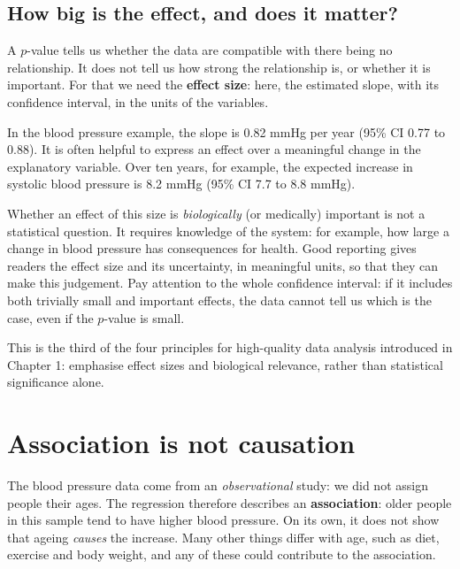 \documentclass[
  letterpaper,
  8pt,
  a4paper]{book}
\begin{document}
\subsection*{How big is the effect, and does it
matter?}\label{how-big-is-the-effect-and-does-it-matter}

A \(p\)-value tells us whether the data are compatible with there being
no relationship. It does not tell us how strong the relationship is, or
whether it is important. For that we need the \textbf{effect size}:
here, the estimated slope, with its confidence interval, in the units of
the variables.

In the blood pressure example, the slope is 0.82 mmHg per year (95\% CI
0.77 to 0.88). It is often helpful to express an effect over a
meaningful change in the explanatory variable. Over ten years, for
example, the expected increase in systolic blood pressure is 8.2 mmHg
(95\% CI 7.7 to 8.8 mmHg).

Whether an effect of this size is \emph{biologically} (or medically)
important is not a statistical question. It requires knowledge of the
system: for example, how large a change in blood pressure has
consequences for health. Good reporting gives readers the effect size
and its uncertainty, in meaningful units, so that they can make this
judgement. Pay attention to the whole confidence interval: if it
includes both trivially small and important effects, the data cannot
tell us which is the case, even if the \(p\)-value is small.

This is the third of the four principles for high-quality data analysis
introduced in Chapter 1: emphasise effect sizes and biological
relevance, rather than statistical significance alone.

\section*{Association is not
causation}\label{association-is-not-causation}


The blood pressure data come from an \emph{observational} study: we did
not assign people their ages. The regression therefore describes an
\textbf{association}: older people in this sample tend to have higher
blood pressure. On its own, it does not show that ageing \emph{causes}
the increase. Many other things differ with age, such as diet, exercise
and body weight, and any of these could contribute to the association.
\end{document}
